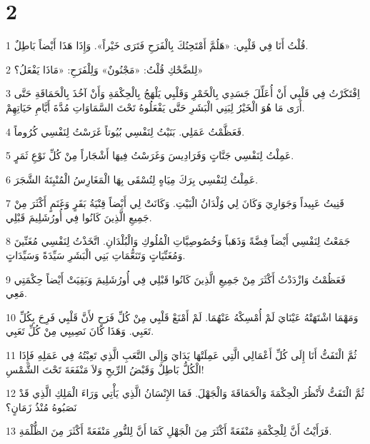 \chapter{2}

\par 1 قُلْتُ أَنَا فِي قَلْبِي: «هَلُمَّ أَمْتَحِنُكَ بِالْفَرَحِ فَتَرَى خَيْراً». وَإِذَا هَذَا أَيْضاً بَاطِلٌ.
\par 2 لِلضَّحْكِ قُلْتُ: «مَجْنُونٌ» وَلِلْفَرَحِ: «مَاذَا يَفْعَلُ؟»
\par 3 اِفْتَكَرْتُ فِي قَلْبِي أَنْ أُعَلِّلَ جَسَدِي بِالْخَمْرِ وَقَلْبِي يَلْهَجُ بِالْحِكْمَةِ وَأَنْ آخُذَ بِالْحَمَاقَةِ حَتَّى أَرَى مَا هُوَ الْخَيْرُ لِبَنِي الْبَشَرِ حَتَّى يَفْعَلُوهُ تَحْتَ السَّمَاوَاتِ مُدَّةَ أَيَّامِ حَيَاتِهِمْ.
\par 4 فَعَظَّمْتُ عَمَلِي. بَنَيْتُ لِنَفْسِي بُيُوتاً غَرَسْتُ لِنَفْسِي كُرُوماً.
\par 5 عَمِلْتُ لِنَفْسِي جَنَّاتٍ وَفَرَادِيسَ وَغَرَسْتُ فِيهَا أَشْجَاراً مِنْ كُلِّ نَوْعِ ثَمَرٍ.
\par 6 عَمِلْتُ لِنَفْسِي بِرَكَ مِيَاهٍ لِتُسْقَى بِهَا الْمَغَارِسُ الْمُنْبِتَةُ الشَّجَرَ.
\par 7 قَنِيتُ عَبِيداً وَجَوَارِيَ وَكَانَ لِي وُلْدَانُ الْبَيْتِ. وَكَانَتْ لِي أَيْضاً قِنْيَةُ بَقَرٍ وَغَنَمٍ أَكْثَرَ مِنْ جَمِيعِ الَّذِينَ كَانُوا فِي أُورُشَلِيمَ قَبْلِي.
\par 8 جَمَعْتُ لِنَفْسِي أَيْضاً فِضَّةً وَذَهَباً وَخُصُوصِيَّاتِ الْمُلُوكِ وَالْبُلْدَانِ. اتَّخَذْتُ لِنَفْسِي مُغَنِّينَ وَمُغَنِّيَاتٍ وَتَنَعُّمَاتِ بَنِي الْبَشَرِ سَيِّدَةً وَسَيِّدَاتٍ.
\par 9 فَعَظُمْتُ وَازْدَدْتُ أَكْثَرَ مِنْ جَمِيعِ الَّذِينَ كَانُوا قَبْلِي فِي أُورُشَلِيمَ وَبَقِيَتْ أَيْضاً حِكْمَتِي مَعِي.
\par 10 وَمَهْمَا اشْتَهَتْهُ عَيْنَايَ لَمْ أُمْسِكْهُ عَنْهُمَا. لَمْ أَمْنَعْ قَلْبِي مِنْ كُلِّ فَرَحٍ لأَنَّ قَلْبِي فَرِحَ بِكُلِّ تَعَبِي. وَهَذَا كَانَ نَصِيبِي مِنْ كُلِّ تَعَبِي.
\par 11 ثُمَّ الْتَفَتُّ أَنَا إِلَى كُلِّ أَعْمَالِي الَّتِي عَمِلَتْهَا يَدَايَ وَإِلَى التَّعَبِ الَّذِي تَعِبْتُهُ فِي عَمَلِهِ فَإِذَا الْكُلُّ بَاطِلٌ وَقَبْضُ الرِّيحِ وَلاَ مَنْفَعَةَ تَحْتَ الشَّمْسِ!
\par 12 ثُمَّ الْتَفَتُّ لأَنْظُرَ الْحِكْمَةَ وَالْحَمَاقَةَ وَالْجَهْلَ. فَمَا الإِنْسَانُ الَّذِي يَأْتِي وَرَاءَ الْمَلِكِ الَّذِي قَدْ نَصَبُوهُ مُنْذُ زَمَانٍ؟
\par 13 فَرَأَيْتُ أَنَّ لِلْحِكْمَةِ مَنْفَعَةً أَكْثَرَ مِنَ الْجَهْلِ كَمَا أَنَّ لِلنُّورِ مَنْفَعَةً أَكْثَرَ مِنَ الظُّلْمَةِ.
